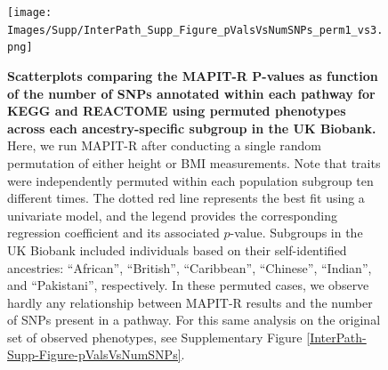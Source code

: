 \documentclass[10pt]{article}
\begin{document}
\begin{landscape}
\begin{figure}[htbp]
\centering
\vspace*{-2.2cm}
\texttt{[image: Images/Supp/InterPath\_Supp\_Figure\_pValsVsNumSNPs\_perm1\_vs3.png]}
\caption{\textbf{Scatterplots comparing the MAPIT-R $\bm{P}$-values as function of the number of SNPs annotated within each pathway for KEGG and REACTOME using permuted phenotypes across each ancestry-specific subgroup in the UK Biobank.} Here, we run MAPIT-R after conducting a single random permutation of either height or BMI measurements. Note that traits were independently permuted within each population subgroup ten different times. The dotted red line represents the best fit using a univariate model, and the legend provides the corresponding regression coefficient and its associated $p$-value. Subgroups in the UK Biobank included individuals based on their self-identified ancestries: ``African'', ``British'', ``Caribbean'', ``Chinese'', ``Indian'', and ``Pakistani'', respectively. In these permuted cases, we observe hardly any relationship between MAPIT-R results and the number of SNPs present in a pathway. For this same analysis on the original set of observed phenotypes, see Supplementary Figure \ref{InterPath-Supp-Figure-pValsVsNumSNPs}.}
\label{InterPath-Supp-Figure-pValsVsNumSNPs-perm1}
\end{figure}
\clearpage
\end{landscape}

\end{document}
